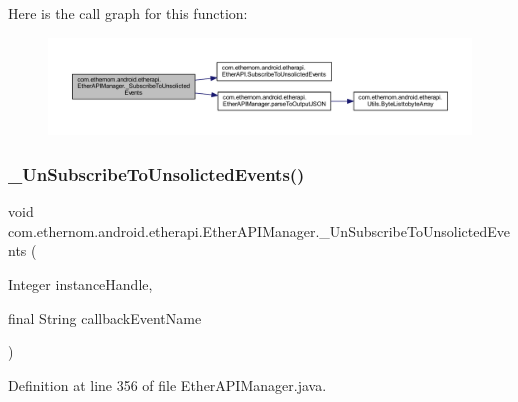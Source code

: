 Here is the call graph for this function\+:
\nopagebreak
\begin{figure}[H]
\begin{center}
\leavevmode
\includegraphics[width=350pt]{classcom_1_1ethernom_1_1android_1_1etherapi_1_1_ether_a_p_i_manager_a1a142394e06213d21483ed176cd44bea_cgraph}
\end{center}
\end{figure}
\mbox{\label{classcom_1_1ethernom_1_1android_1_1etherapi_1_1_ether_a_p_i_manager_a713f2b3b4f67a096d81f190e1d27f1e7}} 
\subsubsection{\texorpdfstring{\+\_\+\+Un\+Subscribe\+To\+Unsolicted\+Events()}{\_UnSubscribeToUnsolictedEvents()}}
{\footnotesize\ttfamily void com.\+ethernom.\+android.\+etherapi.\+Ether\+A\+P\+I\+Manager.\+\_\+\+Un\+Subscribe\+To\+Unsolicted\+Events (\begin{DoxyParamCaption}\item[{Integer}]{instance\+Handle,  }\item[{final String}]{callback\+Event\+Name }\end{DoxyParamCaption})}



Definition at line 356 of file Ether\+A\+P\+I\+Manager.\+java.

